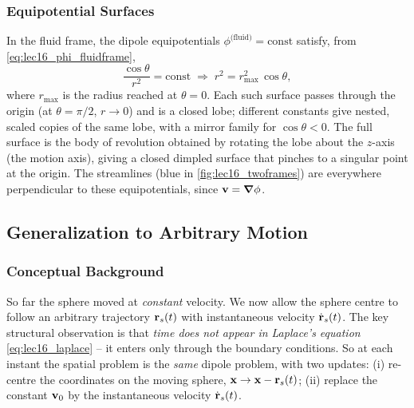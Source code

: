 \documentclass[../main.tex]{subfiles}
\begin{document}
\subsubsection{Equipotential Surfaces}

In the fluid frame, the dipole equipotentials $\phi^{\text{(fluid)}}=\text{const}$ satisfy, from \eqref{eq:lec16_phi_fluidframe},
\begin{equation}
  \frac{\cos\theta}{r^2}=\text{const}\;\Longrightarrow\; r^2 = r_{\max}^2\,\cos\theta,
  \label{eq:lec16_equipotential}
\end{equation}
where $r_{\max}$ is the radius reached at $\theta=0$. Each such surface passes through the origin (at $\theta=\pi/2$, $r\to 0$) and is a closed lobe; different constants give nested, scaled copies of the same lobe, with a mirror family for $\cos\theta<0$. The full surface is the body of revolution obtained by rotating the lobe about the $z$-axis (the motion axis), giving a closed dimpled surface that pinches to a singular point at the origin. The streamlines (blue in \cref{fig:lec16_twoframes}) are everywhere perpendicular to these equipotentials, since $\mathbf{v}=\grad\phi$.


\subsection{Generalization to Arbitrary Motion}\label{sec:lec16:general}

\subsubsection*{Conceptual Background}
So far the sphere moved at \emph{constant} velocity. We now allow the sphere centre to follow an arbitrary trajectory $\mathbf{r}_s(t)$ with instantaneous velocity $\dot{\mathbf{r}}_s(t)$. The key structural observation is that \emph{time does not appear in Laplace's equation} \eqref{eq:lec16_laplace} -- it enters only through the boundary conditions. So at each instant the spatial problem is the \emph{same} dipole problem, with two updates: (i) re-centre the coordinates on the moving sphere, $\mathbf{x}\to\mathbf{x}-\mathbf{r}_s(t)$; (ii) replace the constant $\mathbf{v}_0$ by the instantaneous velocity $\dot{\mathbf{r}}_s(t)$.
\end{document}
